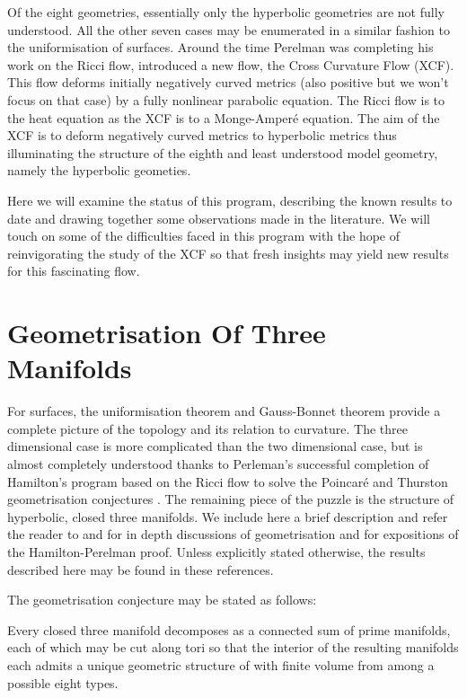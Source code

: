 \documentclass[a4paper,12pt]{amsart}
\begin{document}
Of the eight geometries, essentially only the hyperbolic geometries are not fully understood. All the other seven cases may be enumerated in a similar fashion to the uniformisation of surfaces. Around the time Perelman was completing his work on the Ricci flow, \cite{MR2055396} introduced a new flow, the Cross Curvature Flow (XCF). This flow deforms initially negatively curved metrics (also positive but we won't focus on that case) by a fully nonlinear parabolic equation. The Ricci flow is to the heat equation as the XCF is to a Monge-Amper\'e equation. The aim of the XCF is to deform negatively curved metrics to hyperbolic metrics thus illuminating the structure of the eighth and least understood model geometry, namely the hyperbolic geometies.

Here we will examine the status of this program, describing the known results to date and drawing together some observations made in the literature. We will touch on some of the difficulties faced in this program with the hope of reinvigorating the study of the XCF so that fresh insights may yield new results for this fascinating flow.

\section{Geometrisation Of Three Manifolds}
\label{sec:geometrisation}

For surfaces, the uniformisation theorem and Gauss-Bonnet theorem provide a complete picture of the topology and its relation to curvature. The three dimensional case is more complicated than the two dimensional case, but is almost completely understood thanks to Perleman's successful completion \cite{2003math......7245P,2003math......3109P,2002math.....11159P} of Hamilton's program based on the Ricci flow \cite{Hamilton:/1982} to solve the Poincar\'e and Thurston geometrisation conjectures \cite{MR648524}. The remaining piece of the puzzle is the structure of hyperbolic, closed three manifolds. We include here a brief description and refer the reader to \cite{MR705527} and \cite{MR1435975} for in depth discussions of geometrisation and \cite{MR3186136,MR2334563,MR2460872} for expositions of the Hamilton-Perelman proof. Unless explicitly stated otherwise, the results described here may be found in these references.

The geometrisation conjecture may be stated as follows:

\begin{thm}
\label{thm:geometrisation}

Every closed three manifold decomposes as a connected sum of prime manifolds, each of which may be cut along tori so that the interior of the resulting manifolds each admits a unique geometric structure of with finite volume from among a possible eight types.
\end{thm}
\end{document}
